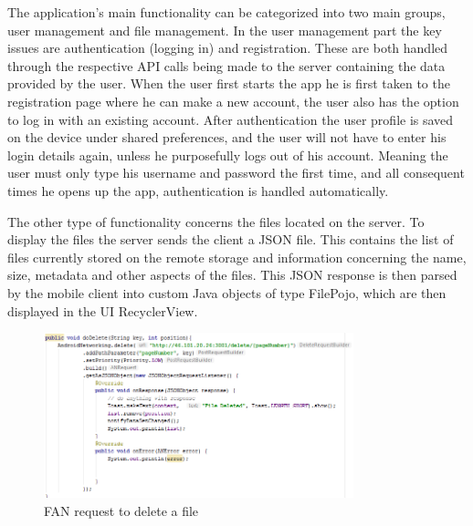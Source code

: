 \documentclass[11pt]{article}
\begin{document}
The application’s main functionality can be categorized into two main groups, user management and file management. In the user management part the key issues are authentication (logging in) and registration. These are both handled through the respective API calls being made to the server containing the data provided by the user. When the user first starts the app he is first taken to the registration page where he can make a new account, the user also has the option to log in with an existing account. After authentication the user profile is saved on the device under shared preferences, and the user will not have to enter his login details again, unless he purposefully logs out of his account. Meaning the user must only type his username and password the first time, and all consequent times he opens up the app, authentication is handled automatically.


The other type of functionality concerns the files located on the server. To display the files the server sends the client a JSON file. This contains the list of files currently stored on the remote storage and information concerning the name, size, metadata and other aspects of the files. This JSON response is then parsed by the mobile client into custom Java objects of type FilePojo, which are then displayed in the UI RecyclerView. 

\begin{figure} [h!]
\caption{FAN request to delete a file}
\centering
\includegraphics[width=0.8\textwidth]{delete.PNG}
\end{figure}
\end{document}
